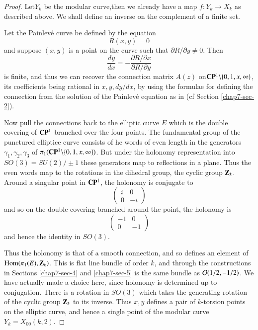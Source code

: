 \begin{proof}
Let\pageoriginale $Y_{k}$ be the modular curve,then we already have a map $f : Y_{k}\rightarrow X_{k}$ as described above. We shall define an inverse on the complement of a finite set.

Let the Painlev\'e curve be defined by the equation
$$
R(x,y)=0
$$
and suppose $(x,y)$ is a point on the curve such that $\partial R/\partial y \neq 0$. Then
$$
\dfrac{dy}{dx}= -\dfrac{\partial R /\partial x}{\partial R/ \partial y}
$$
is finite, and thus we can recover the connection matrix $A(z)$ on\break $\mathbf{C}\mathbf{P}^{1}\backslash \{0,1,x, \infty\}$, its coefficients being rational in $x,y, dy/dx$, by using the formulae for defining the connection from the solution of the Painlev\'e equation as in \cite{chap7-key8} (cf Section \ref{chap7-sec-2}).

Now pull the connections back to the elliptic curve $E$ which is the double covering of $\mathbf{C}\mathbf{P}^{1}$ branched over the four points. The fundamental group of the punctured elliptice curve consists of he words of even length in the generators $\gamma_{1}, \gamma_{2}, \gamma_{3}$ of $\pi_{1}(\mathbf{C}\mathbf{P}^{1}\backslash \{0,1,x,\infty\})$. But under the holonomy representation into $SO(3)=SU(2)/\pm 1$ these generators map to reflections in a plane. Thus the even words map to the rotations in the dihedral group, the cyclic group $\mathbf{Z}_{k}$. Around a singular point in $\mathbf{C}\mathbf{P}^{1}$, the holonomy is conjugate to
$$
\begin{pmatrix}
 i & 0\\
 0 & -i
\end{pmatrix}
$$
and so on the double covering branched around the point, the holonomy is
$$
\begin{pmatrix}
 -1 & 0\\
 0 & -1
\end{pmatrix}
$$
and hence the identity in $SO(3)$.

Thus the holonomy is that of a smooth connection, and so defines an element of $\operatorname{Hom}(\pi_{1}(E), \mathbf{Z}_{k})$. This is flat line bundle of order $k$, and through the constructions in Sections \ref{chap7-sec-4} and \ref{chap7-sec-5} is the same bundle as $\mathcal{O}(1/2, -1/2)$. We have actually made a choice here, since holonomy is determined up to
 conjugation. There is a rotation in $SO(3)$ which takes the generating rotation of the cyclic group $\mathbf{Z}_{k}$ to its inverse. Thus $x,y$ defines a pair of $k$-torsion points on the elliptic curve, and hence a single point of the modular curve $Y_{k} = X_{00}(k,2)$.
\end{proof}

